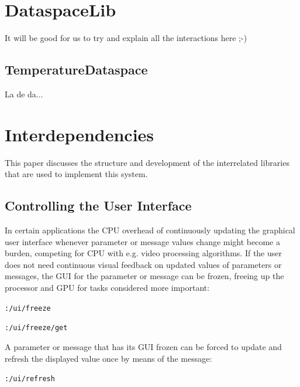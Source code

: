 \documentclass{article}
\begin{document}
\section{DataspaceLib}\label{sec:dataspacelib}

It will be good for us to try and explain all the interactions here ;-)

\subsection{TemperatureDataspace}\label{subsec:temperature_dataspace}

La de da...



\section{Interdependencies}\label{sec:interdependencies}

This paper discusses the structure and development of the interrelated libraries that are used to implement this system.



\subsection{Controlling the User Interface} %
\label{sub:controlling_the_user_interface}

In certain applications the CPU overhead of continuously updating the graphical user interface whenever parameter or message values change might become a burden, competing for CPU with e.g. video processing algorithms. If the user does not need continuous visual feedback on updated values of parameters or messages, the GUI for the parameter or message can be frozen, freeing up the processor and GPU for tasks considered more important:

\texttt{:/ui/freeze}

\texttt{:/ui/freeze/get}

A parameter or message that has its GUI frozen can be forced to update and refresh the displayed value once by means of the message:

\texttt{:/ui/refresh}




\end{document}
